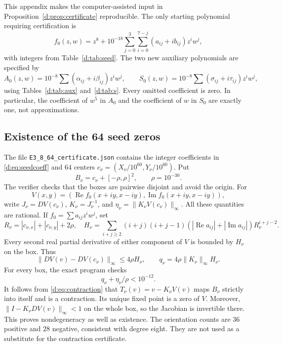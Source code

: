 \documentclass[UTF8,11pt]{ctexart}
\theoremstyle{definition}
\numberwithin{equation}{section}
\DeclareMathOperator{\Rea}{Re}\DeclareMathOperator{\Ima}{Im}
\begin{document}
This appendix makes the computer-assisted input in
Proposition~\ref{d:prop:certificate} reproducible. The only starting
polynomial requiring certification is
\begin{equation}\label{d:eq:seedcoeff}
 f_0(z,w)=z^8+10^{-18}
 \sum_{j=0}^3\sum_{i=0}^{7-j}(a_{ij}+ib_{ij})z^iw^j,
\end{equation}
with integers from Table~\ref{d:tab:seed}. The two new auxiliary
polynomials are specified by
\begin{equation}\label{d:eq:auxcoeff}
 A_0(z,w)=10^{-8}\sum(\alpha_{ij}+i\beta_{ij})z^iw^j,
 \qquad
 S_0(z,w)=10^{-8}\sum(\sigma_{ij}+i\tau_{ij})z^iw^j,
\end{equation}
using Tables~\ref{d:tab:aux} and~\ref{d:tab:s}. Every omitted coefficient is
zero. In particular, the coefficient of $w^5$ in $A_0$ and the
coefficient of $w$ in $S_0$ are exactly one, not approximations.

\subsection{Existence of the 64 seed zeros}
The file \texttt{E3\_8\_64\_certificate.json} contains the integer
coefficients in \eqref{d:eq:seedcoeff} and $64$ centers
$c_\nu=(X_\nu/10^{60},Y_\nu/10^{60})$. Put
\[
 B_\nu=c_\nu+[-\rho,\rho]^2,\qquad \rho=10^{-30}.
\]
The verifier checks that the boxes are pairwise disjoint and avoid the
origin. For
\[
 V(x,y)=(\Rea f_0(x+iy,x-iy),\Ima f_0(x+iy,x-iy)),
\]
write $J_\nu=DV(c_\nu)$, $K_\nu=J_\nu^{-1}$, and
$\eta_\nu=\|K_\nu V(c_\nu)\|_\infty$.
All these quantities are rational. If $f_0=\sum a_{ij}z^iw^j$, set
\[
 R_\nu=|c_{\nu,x}|+|c_{\nu,y}|+2\rho,
 \quad
 H_\nu=\sum_{i+j\ge2}(i+j)(i+j-1)
 (|\Rea a_{ij}|+|\Ima a_{ij}|)R_\nu^{i+j-2}.
\]
Every second real partial derivative of either component of $V$ is
bounded by $H_\nu$ on the box. Thus
\[
 \|DV(v)-DV(c_\nu)\|_\infty\le4\rho H_\nu,\qquad
 q_\nu=4\rho\|K_\nu\|_\infty H_\nu.
\]
For every box, the exact program checks
\begin{equation}\label{d:eq:contraction}
 q_\nu+\eta_\nu/\rho<10^{-12}.
\end{equation}
It follows from \eqref{d:eq:contraction} that
$T_\nu(v)=v-K_\nu V(v)$ maps $B_\nu$ strictly into itself and is a
contraction. Its unique fixed point is a zero of $V$. Moreover,
$\|I-K_\nu DV(v)\|_\infty<1$ on the whole box, so the Jacobian is
invertible there. This proves nondegeneracy as well as existence.
The orientation counts are $36$ positive and $28$ negative, consistent
with degree eight. They are not used as a substitute for the contraction
certificate.
\end{document}
